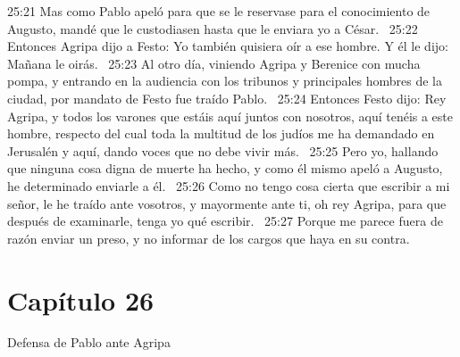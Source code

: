 25:21 Mas como Pablo apeló para que se le reservase para el conocimiento de Augusto, mandé que le custodiasen hasta que le enviara yo a César.  
25:22 Entonces Agripa dijo a Festo: Yo también quisiera oír a ese hombre. Y él le dijo: Mañana le oirás.  
25:23 Al otro día, viniendo Agripa y Berenice con mucha pompa, y entrando en la audiencia con los tribunos y principales hombres de la ciudad, por mandato de Festo fue traído Pablo.  
25:24 Entonces Festo dijo: Rey Agripa, y todos los varones que estáis aquí juntos con nosotros, aquí tenéis a este hombre, respecto del cual toda la multitud de los judíos me ha demandado en Jerusalén y aquí, dando voces que no debe vivir más.  
25:25 Pero yo, hallando que ninguna cosa digna de muerte ha hecho, y como él mismo apeló a Augusto, he determinado enviarle a él.  
25:26 Como no tengo cosa cierta que escribir a mi señor, le he traído ante vosotros, y mayormente ante ti, oh rey Agripa, para que después de examinarle, tenga yo qué escribir.  
25:27 Porque me parece fuera de razón enviar un preso, y no informar de los cargos que haya en su contra.  
\section*{Capítulo 26}
Defensa de Pablo ante Agripa  

